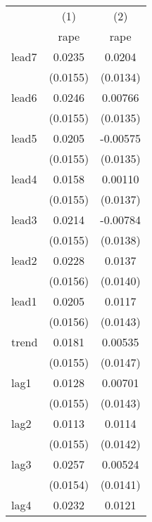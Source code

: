 {
\def\sym#1{\ifmmode^{#1}\else\(^{#1}\)\fi}
\begin{tabular}{l*{2}{c}}
\hline\hline
            &\multicolumn{1}{c}{(1)}&\multicolumn{1}{c}{(2)}\\
            &\multicolumn{1}{c}{rape}&\multicolumn{1}{c}{rape}\\
\hline
lead7       &      0.0235         &      0.0204         \\
            &    (0.0155)         &    (0.0134)         \\
[1em]
lead6       &      0.0246         &     0.00766         \\
            &    (0.0155)         &    (0.0135)         \\
[1em]
lead5       &      0.0205         &    -0.00575         \\
            &    (0.0155)         &    (0.0135)         \\
[1em]
lead4       &      0.0158         &     0.00110         \\
            &    (0.0155)         &    (0.0137)         \\
[1em]
lead3       &      0.0214         &    -0.00784         \\
            &    (0.0155)         &    (0.0138)         \\
[1em]
lead2       &      0.0228         &      0.0137         \\
            &    (0.0156)         &    (0.0140)         \\
[1em]
lead1       &      0.0205         &      0.0117         \\
            &    (0.0156)         &    (0.0143)         \\
[1em]
trend       &      0.0181         &     0.00535         \\
            &    (0.0155)         &    (0.0147)         \\
[1em]
lag1        &      0.0128         &     0.00701         \\
            &    (0.0155)         &    (0.0143)         \\
[1em]
lag2        &      0.0113         &      0.0114         \\
            &    (0.0155)         &    (0.0142)         \\
[1em]
lag3        &      0.0257         &     0.00524         \\
            &    (0.0154)         &    (0.0141)         \\
[1em]
lag4        &      0.0232         &      0.0121         \\

\end{tabular}}

